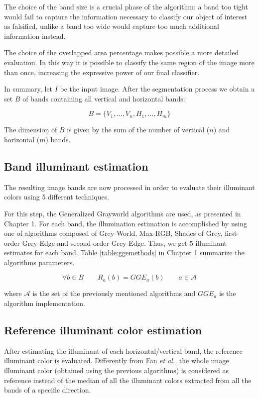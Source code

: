 The choice of the band size is a crucial phase of the algorithm: a band too tight would fail to capture the information necessary to classify our object of interest as falsified, unlike a band too wide would capture too much additional information instead.

The choice of the overlapped area percentage makes possible a more detailed evaluation. In this way it is possible to classify the same region of the image more than once, increasing the expressive power of our final classifier.
 
In summary, let $I$ be the input image. After the segmentation process we obtain a set $B$ of bands containing all vertical and horizontal bands:

$$
B = \{V_1, \ldots, V_n, H_1, \ldots, H_m\}
$$

The dimension of $B$ is given by the sum of the number of vertical ($n$) and horizontal ($m$) bands.

\subsection{Band illuminant estimation}

The resulting image bands are now processed in order to evaluate their illuminant colors using 5 different techniques.

For this step, the Generalized Grayworld \cite{van2007edge} algorithms are used, as presented in Chapter 1. For each band, the illumination estimation is accomplished by using one of algorithms composed of Grey-World, Max-RGB, Shades of Grey, first-order Grey-Edge and second-order Grey-Edge. Thus, we get 5 illuminant estimates for each band.
Table \ref{table:ggemethods} in Chapter 1 summarize the algorithms parameters.

$$
\forall b \in B \qquad R_a(b) = GGE_a(b) \qquad a \in \mathcal{A}
$$

where $\mathcal{A}$ is the set of the previously mentioned algorithms and $GGE_a$ is the algorithm implementation.

\subsection{Reference illuminant color estimation}

After estimating the illuminant of each horizontal/vertical band, the reference illuminant color is evaluated. Differently from Fan \emph{et al.}\cite{fan2015image}, the whole image illuminant color (obtained using the previous algorithms) is considered as reference instead of the median of all the illuminant colors extracted from all the bands of a specific direction. 

